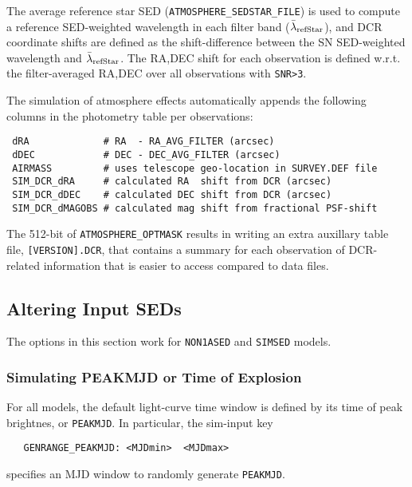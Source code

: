 \documentclass[12pt]{article}
\begin{document}
\newcommand{\lamrefStar}{$\bar{\lambda}_{\rm refStar}$}
The average reference star SED ({\tt ATMOSPHERE\_SEDSTAR\_FILE}) is used to
compute a reference SED-weighted wavelength in each filter band (\lamrefStar), 
and DCR coordinate shifts are defined as the shift-difference between 
the SN SED-weighted wavelength and \lamrefStar.
The RA,DEC shift for each observation is defined w.r.t.
the filter-averaged RA,DEC over all observations with {\tt SNR>3}.

The simulation of atmosphere effects automatically appends the following
columns in the photometry table per observations:
\begin{verbatim}
 dRA             # RA  - RA_AVG_FILTER (arcsec)
 dDEC            # DEC - DEC_AVG_FILTER (arcsec)
 AIRMASS         # uses telescope geo-location in SURVEY.DEF file
 SIM_DCR_dRA     # calculated RA  shift from DCR (arcsec)
 SIM_DCR_dDEC    # calculated DEC shift from DCR (arcsec)
 SIM_DCR_dMAGOBS # calculated mag shift from fractional PSF-shift
\end{verbatim}
%

The 512-bit of {\tt ATMOSPHERE\_OPTMASK} results in writing
an extra auxillary table file, {\tt [VERSION].DCR}, that contains a
summary for each observation of DCR-related information that is easier 
to access compared to data files.

\clearpage
\subsection{Altering Input SEDs}
\label{subsec:Alter_SED}

The options in this section work for 
{\tt NON1ASED} and {\tt SIMSED} models.

\subsubsection{Simulating PEAKMJD or Time of Explosion}
\label{sss:tpeak_or_texplode}


For all models, the default light-curve time window is
defined by its time of peak brightnes, or {\tt PEAKMJD}.
In particular, the sim-input key 
\begin{verbatim}
   GENRANGE_PEAKMJD: <MJDmin>  <MJDmax>
\end{verbatim}
specifies an MJD window to randomly generate {\tt PEAKMJD}.
\end{document}
